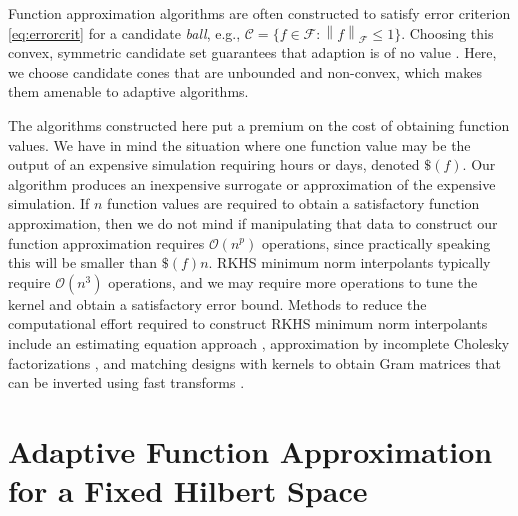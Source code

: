 \documentclass[]{mcom-l}
\theoremstyle{theorem}
\theoremstyle{remark}
\newcommand{\cc}{\mathcal{C}}
\newcommand{\calf}{{\mathcal{F}}}
\newcommand{\norm}[2][{}]{\ensuremath{\left \lVert #2 \right \rVert}_{#1}}
\newcommand{\Order}{\mathcal{O}}
\begin{document}
Function approximation algorithms are often constructed to satisfy error criterion \eqref{eq:errorcrit} for a candidate \emph{ball}, e.g., $\cc = \{f \in \calf : \norm[\calf]{f} \le 1\}$.  Choosing this convex, symmetric candidate set guarantees that adaption is of no value \cite{Bak71}.  Here, we choose candidate cones that are unbounded and non-convex, which makes them amenable to adaptive algorithms.

The algorithms constructed here put a premium on the cost of obtaining function values.  We have in mind the situation where one function value may be the output of an expensive simulation requiring hours or days, denoted $\$(f)$.  Our algorithm produces an inexpensive surrogate or approximation of the expensive simulation.  If $n$ function values are required to obtain a satisfactory function approximation, then we do not mind if manipulating that data to construct our function approximation requires $\Order(n^p)$ operations, since practically speaking this will be smaller than $\$(f) n$.  RKHS minimum  norm interpolants typically require $\Order(n^3)$ operations, and we may require more operations to tune the kernel and obtain a satisfactory error bound.  Methods to reduce the computational effort required to construct RKHS minimum norm interpolants include an estimating equation approach \cite{AniCheSte16a}, approximation by incomplete Cholesky factorizations \cite{OwhEtal19a}, and matching designs with kernels to obtain Gram matrices that can be inverted using fast transforms \cite{RatHic19a}.


\section{Adaptive Function Approximation for a Fixed Hilbert Space} \label{sec:fixedF}

\end{document}

